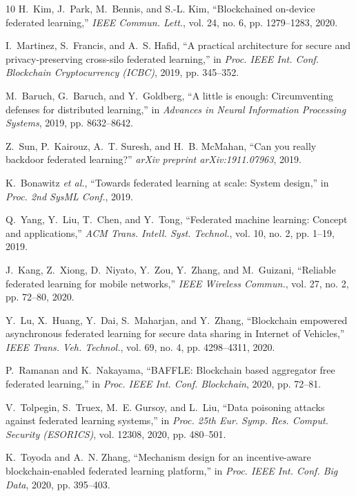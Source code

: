 \documentclass[12pt,a4paper,onecolumn]{article}
\begin{document}
\begin{thebibliography}{10}
H.~Kim, J.~Park, M.~Bennis, and S.-L. Kim,
``Blockchained on-device federated learning,''
\emph{IEEE Commun. Lett.}, vol. 24, no. 6, pp. 1279--1283, 2020.

I.~Martinez, S.~Francis, and A.~S. Hafid,
``A practical architecture for secure and privacy-preserving cross-silo federated learning,''
in \emph{Proc. IEEE Int. Conf. Blockchain Cryptocurrency (ICBC)}, 2019, pp. 345--352.

M.~Baruch, G.~Baruch, and Y.~Goldberg,
``A little is enough: Circumventing defenses for distributed learning,''
in \emph{Advances in Neural Information Processing Systems}, 2019, pp. 8632--8642.

Z.~Sun, P.~Kairouz, A.~T. Suresh, and H.~B. McMahan,
``Can you really backdoor federated learning?''
\emph{arXiv preprint arXiv:1911.07963}, 2019.

K.~Bonawitz \emph{et al.},
``Towards federated learning at scale: System design,''
in \emph{Proc. 2nd SysML Conf.}, 2019.

Q.~Yang, Y.~Liu, T.~Chen, and Y.~Tong,
``Federated machine learning: Concept and applications,''
\emph{ACM Trans. Intell. Syst. Technol.}, vol. 10, no. 2, pp. 1--19, 2019.

J.~Kang, Z.~Xiong, D.~Niyato, Y.~Zou, Y.~Zhang, and M.~Guizani,
``Reliable federated learning for mobile networks,''
\emph{IEEE Wireless Commun.}, vol. 27, no. 2, pp. 72--80, 2020.

Y.~Lu, X.~Huang, Y.~Dai, S.~Maharjan, and Y.~Zhang,
``Blockchain empowered asynchronous federated learning for secure data sharing in Internet of Vehicles,''
\emph{IEEE Trans. Veh. Technol.}, vol. 69, no. 4, pp. 4298--4311, 2020.

P.~Ramanan and K.~Nakayama,
``BAFFLE: Blockchain based aggregator free federated learning,''
in \emph{Proc. IEEE Int. Conf. Blockchain}, 2020, pp. 72--81.

V.~Tolpegin, S.~Truex, M.~E. Gursoy, and L.~Liu,
``Data poisoning attacks against federated learning systems,''
in \emph{Proc. 25th Eur. Symp. Res. Comput. Security (ESORICS)}, vol. 12308, 2020, pp. 480--501.

K.~Toyoda and A.~N. Zhang,
``Mechanism design for an incentive-aware blockchain-enabled federated learning platform,''
in \emph{Proc. IEEE Int. Conf. Big Data}, 2020, pp. 395--403.


\end{thebibliography}
\end{document}
